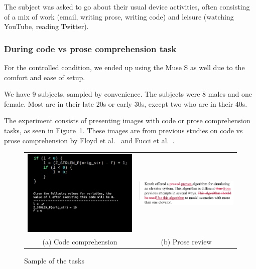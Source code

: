             The subject was asked to go about their usual device activities, often consisting of a mix of work (email, writing prose, writing code) and leisure (watching YouTube, reading Twitter).

        \subsubsection*{During code vs prose comprehension task}

            For the controlled condition, we ended up using the Muse S as well due to the comfort and ease of setup.

            We have 9 subjects, sampled by convenience. The subjects were 8 males and one female. Most are in their late 20s or early 30s, except two who are in their 40s.

            The experiment consists of presenting images with code or prose comprehension tasks, as seen in Figure~\ref{fig:tasks}. These images are from previous studies on code vs prose comprehension by Floyd et al.~\cite{floyd_decoding_2017} and Fucci et al.~\cite{fucci_replication_2019}. 

            \begin{figure}[H]
                \centering
                \begin{tabular}{cc}
                    \includegraphics[trim=25 160 0 0,clip,width=75mm]{img/final-1-1.png}
                    &
                    \includegraphics[trim=20 0 20 0,clip,width=75mm]{img/bugs_1.PNG}
                    \\
                    (a) Code comprehension
                    &
                    (b) Prose review
                \end{tabular}
                \caption{Sample of the tasks}\label{fig:tasks}
            \end{figure}

